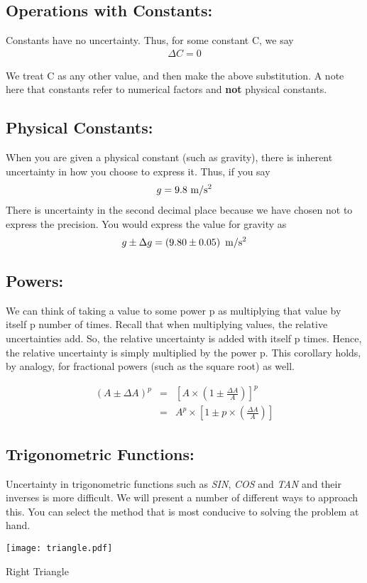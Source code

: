 	\subsection{Operations with Constants:}
	
		Constants have no uncertainty. Thus, for some constant C, we say
			\begin{eqnarray*} \Delta C = 0 
			\end{eqnarray*}
			
		We treat C as any other value, and then make the above substitution.  A note here that constants refer to numerical factors and \textbf{not} physical constants.
	\subsection{Physical Constants:}
		When you are given a physical constant (such as gravity), there is inherent uncertainty in how you choose to express it.  Thus, if you say
		\begin{eqnarray*} g = 9.8 {\rm~m}/{\rm s}^{2}
		\end{eqnarray*}
		There is uncertainty in the second decimal place because we have chosen not to express 
		the precision.  You would express the value for gravity as
		\begin{eqnarray*}g\pm \Delta g = \left(9.80 \pm 0.05\right)  {\rm~m}/{\rm s}^{2}
		\end{eqnarray*}
		
	\subsection{Powers:}
	
		We can think of taking a value to some power p as multiplying that value by itself p number of times. Recall that when multiplying values, the relative uncertainties add. So, the relative uncertainty is added with itself p times. Hence, the relative uncertainty is simply multiplied by the power p. This corollary holds, by analogy, for fractional powers (such as the square root) as well.
		
		\begin{eqnarray*} 
			\left(A \pm \Delta A\right)^p&=&\left[A \times \left(1 \pm \frac{\Delta A}{A}\right)\right]^p\\&=& A^p \times \left[1 \pm p\times \left(\frac{\Delta A}{A}\right)\right]
		\end{eqnarray*}
	
	\subsection{Trigonometric Functions:}
		Uncertainty in trigonometric functions such as \textit{SIN}, \textit{COS} and \textit{TAN} and their inverses is more difficult.  We will present a number of different ways to approach this.  You can select the method that is most conducive to solving the problem at hand.
		\begin{marginfigure}
		\centerline{\texttt{[image: triangle.pdf]}}
		\caption{Right Triangle}\label{fig:triangle}
		\end{marginfigure}
		
